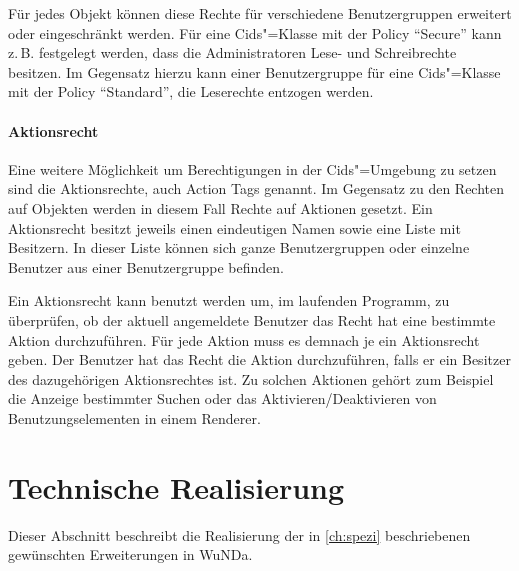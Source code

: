 Für jedes Objekt können diese Rechte für verschiedene Benutzergruppen erweitert oder eingeschränkt werden.
Für eine Cids"=Klasse mit der Policy "`Secure"' kann z.\,B. festgelegt werden, dass die Administratoren Lese- und Schreibrechte besitzen.
Im Gegensatz hierzu kann einer Benutzergruppe für eine Cids"=Klasse mit der Policy "`Standard"', die Leserechte entzogen werden. \autocite[vgl.][]{cismet-workshop}

\paragraph{Aktionsrecht}
Eine weitere Möglichkeit um Berechtigungen in der Cids"=Umgebung zu setzen sind die Aktionsrechte, auch Action Tags genannt.
Im Gegensatz zu den Rechten auf Objekten werden in diesem Fall Rechte auf Aktionen gesetzt.
Ein Aktionsrecht besitzt jeweils einen eindeutigen Namen sowie eine Liste mit Besitzern.
In dieser Liste können sich ganze Benutzergruppen oder einzelne Benutzer aus einer Benutzergruppe befinden.

Ein Aktionsrecht kann benutzt werden um, im laufenden Programm, zu überprüfen, ob der aktuell angemeldete Benutzer das Recht hat eine bestimmte Aktion durchzuführen.
Für jede Aktion muss es demnach je ein Aktionsrecht geben.
Der Benutzer hat das Recht die Aktion durchzuführen, falls er ein Besitzer des dazugehörigen Aktionsrechtes ist.
Zu solchen Aktionen gehört zum Beispiel die Anzeige bestimmter Suchen oder das Aktivieren/Deaktivieren von Benutzungselementen in einem Renderer.



\section{Technische Realisierung}
Dieser Abschnitt beschreibt die Realisierung der in \autoref{ch:spezi} beschriebenen gewünschten Erweiterungen in \ac{WuNDa}.

